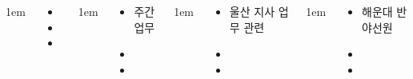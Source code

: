 \documentclass[	20pt, 
							a0paper, 
							landscape,
							margin=0mm, %
							innermargin=10mm,  		%
							blockverticalspace=4mm, %
							colspace=5mm, 
							subcolspace=0mm
							]{tikzposter}
\begin{document}
\begin{columns}
			{
					\setlength{\leftmargini}{4em}
					\setlength{\labelsep} {1em}
				\begin{LARGE}
					\begin{itemize}
					\item 
					\item 
					\item 
					\end{itemize}
				\end{LARGE}
			} %





			{
					\setlength{\leftmargini}{4em}
					\setlength{\labelsep} {1em}
				\begin{LARGE}
					\begin{itemize}
					\item 주간업무
					\item 
					\item 
					\end{itemize}
				\end{LARGE}
			} %


			{
					\setlength{\leftmargini}{4em}
					\setlength{\labelsep} {1em}
				\begin{LARGE}
					\begin{itemize}
					\item 울산 지사 업무 관련
					\item 
					\item 
					\end{itemize}
				\end{LARGE}
			} %




			{
					\setlength{\leftmargini}{4em}
					\setlength{\labelsep} {1em}
				\begin{LARGE}
					\begin{itemize}
					\item 해운대 반야선원
					\item 
					\item 
					\end{itemize}
				\end{LARGE}
			} %



\end{columns}
\end{document}
